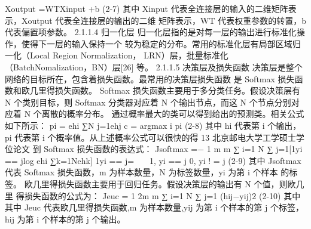 Xoutput =WTXinput +b (2-7)
其中 Xinput 代表全连接层的输入的二维矩阵表示，Xoutput 代表全连接层的输出的二维 矩阵表示，WT 代表权重参数的转置，b 代表偏置项参数。
2.1.1.4 归一化层
归一化层指的是对每一层的输出进行标准化操作，使得下一层的输入保持一个 较为稳定的分布。常用的标准化层有局部区域归一化（Local Region Normalization， LRN）层，批量标准化（BatchNomalization，BN）层[26] 等。
2.1.1.5 决策层及损失函数
决策层是整个网络的目标所在，包含着损失函数。最常用的决策层损失函数 是 Softmax 损失函数和欧几里得损失函数。 Softmax 损失函数主要用于多分类任务。假设决策层有 N 个类别目标，则 Softmax 分类器对应着 N 个输出节点，而这 N 个节点分别对应着 N 个离散的概率分布。 通过概率最大的类可以得到给出的预测类。相关公式如下所示：
pi =
ehi ∑N j=1ehj c = argmax i pi
(2-8)
其中 hi 代表第 i 个输出，pi 代表第 i 个概率值。从上述概率公式可以很快的得
13
北京邮电大学工学硕士学位论文
到 Softmax 损失函数的表达式：
Jsoftmax =−
1 m
m ∑ i=1
N ∑ j=1[1{yi == j}log ehi ∑k=1Nehk]
1{yi == j}=  
1, yi == j 0, yi ! = j
(2-9)
其中 Jsoftmax 代表 Softmax 损失函数，m 为样本数量，N 为标签数量，yi 为第 i 个样本 的标签。 欧几里得损失函数主要用于回归任务。假设决策层的输出有 N 个值，则欧几里 得损失函数的公式为：
Jeuc =
1 2m
m ∑ i=1
N ∑ j=1
(hij−yij)2 (2-10)
其中其中 Jeuc 代表欧几里得损失函数,m 为样本数量,yij 为第 i 个样本的第 j 个标签， hij 为第 i 个样本的第 j 个输出。

